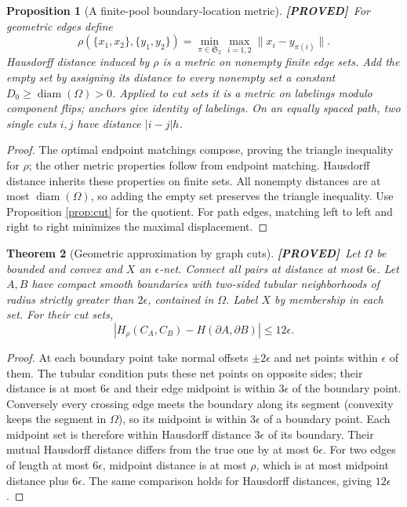 \documentclass[11pt]{article}
\newtheorem{theorem}{Theorem}[section]
\newtheorem{proposition}[theorem]{Proposition}
\theoremstyle{definition}
\newcommand{\1}{\mathbf 1}
\newcommand{\pr}{\textbf{[PROVED]}}
\begin{document}
\begin{proposition}[A finite-pool boundary-location metric]\label{prop:metric}
\pr\ For geometric edges define
\[
 \rho(\{x_1,x_2\},\{y_1,y_2\})
 =\min_{\pi\in\mathfrak S_2}\max_{i=1,2}\|x_i-y_{\pi(i)}\|.
\]
Hausdorff distance induced by $\rho$ is a metric on nonempty finite edge
sets. Add the empty set by assigning its distance to every nonempty set a
constant $D_0\ge\operatorname{diam}(\Omega)>0$.
Applied to cut sets it is a metric on labelings modulo component flips;
anchors give identity of labelings. On an equally spaced path, two single
cuts $i,j$ have distance $|i-j|h$.
\end{proposition}
\begin{proof}
The optimal endpoint matchings compose, proving the triangle inequality
for $\rho$; the other metric properties follow from endpoint matching.
Hausdorff distance inherits these properties on finite sets.
All nonempty distances are at most $\operatorname{diam}(\Omega)$, so adding
the empty set preserves the triangle inequality. Use
Proposition \ref{prop:cut} for the quotient. For path edges, matching left
to left and right to right minimizes the maximal displacement.
\end{proof}

\begin{theorem}[Geometric approximation by graph cuts]\label{th:geometry}
\pr\ Let $\Omega$ be bounded and convex and $X$ an $\epsilon$-net.
Connect all pairs at distance at most $6\epsilon$.
Let $A,B$ have compact smooth boundaries with two-sided tubular neighborhoods
of radius strictly greater than $2\epsilon$, contained in $\Omega$.
Label $X$ by membership in each set. For their cut sets,
\[
 \left|H_\rho(C_A,C_B)-H(\partial A,\partial B)\right|\le12\epsilon.
\]
\end{theorem}
\begin{proof}
At each boundary point take normal offsets $\pm2\epsilon$ and net points
within $\epsilon$ of them. The tubular condition puts these net points on
opposite sides; their distance is at most $6\epsilon$ and their edge
midpoint is within $3\epsilon$ of the boundary point.
Conversely every crossing edge meets the boundary along its segment
(convexity keeps the segment in $\Omega$), so its midpoint is within
$3\epsilon$ of a boundary point.
Each midpoint set is therefore within Hausdorff distance $3\epsilon$ of
its boundary. Their mutual Hausdorff distance differs from the true one
by at most $6\epsilon$.
For two edges of length at most $6\epsilon$, midpoint distance is at most
$\rho$, which is at most midpoint distance plus $6\epsilon$.
The same comparison holds for Hausdorff distances, giving $12\epsilon$.
\end{proof}
\end{document}
